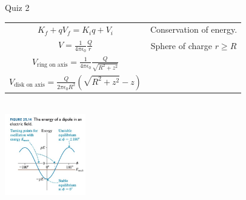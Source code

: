 \documentclass{article}
\newcommand{\K}{\frac{1}{4 \pi \epsilon_0}}
\begin{document}
\begin{section}{Quiz 2}
\begin{tabular}{|c|c|}
	 $K_f + q V_f = K_i q + V_i$                                                                  & Conservation of energy.                                                    \\

	 $V = \K \frac{Q}{r}$                                                                         & Sphere of charge $r \ge R$                                                 \\

	 $V_\text{ring on axis} = \K \frac{Q}{\sqrt{R^2 + z^2}}$                                      &                                                                            \\

	 $V_\text{disk on axis} = \frac{Q}{2 \pi \epsilon_0 R^2} \left( \sqrt{R^2 + z^2} - z \right)$ &                                                                            \\



	 \hline
 \end{tabular}
 \\
 \includegraphics[width=100pt]{final_cheet_sheet_resources/gxmdaouxejjbmynkdouerjsizepbpzqv.jpg}

\end{section}
\end{document}
